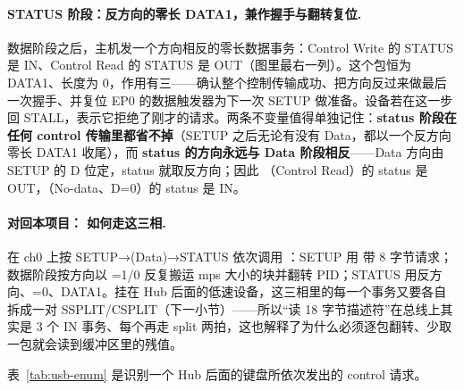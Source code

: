 \paragraph{STATUS 阶段：反方向的零长 DATA1，兼作握手与翻转复位.}
数据阶段之后，主机发一个方向相反的零长数据事务：Control Write 的 STATUS 是 IN、Control Read 的 STATUS 是 OUT（图里最右一列）。这个包恒为 DATA1、长度为 0，作用有三——确认整个控制传输成功、把方向反过来做最后一次握手、并复位 EP0 的数据触发器为下一次 SETUP 做准备。设备若在这一步回 STALL，表示它拒绝了刚才的请求。两条不变量值得单独记住：\textbf{status 阶段在任何 control 传输里都省不掉}（SETUP 之后无论有没有 Data，都以一个反方向零长 DATA1 收尾），而 \textbf{status 的方向永远与 Data 阶段相反}——Data 方向由 SETUP 的 D 位定，status 就取反方向；因此 （Control Read）的 status 是 OUT，（No-data、D=0）的 status 是 IN。

\paragraph{对回本项目： 如何走这三相.}
 在 ch0 上按 SETUP→(Data)→STATUS 依次调用 ：SETUP 用  带 8 字节请求；数据阶段按方向以 =1/0 反复搬运 mps 大小的块并翻转 PID；STATUS 用反方向、=0、DATA1。挂在 Hub 后面的低速设备，这三相里的每一个事务又要各自拆成一对 SSPLIT/CSPLIT（下一小节）——所以“读 18 字节描述符”在总线上其实是 3 个 IN 事务、每个再走 split 两拍，这也解释了为什么必须逐包翻转、少取一包就会读到缓冲区里的残值。

表~\ref{tab:usb-enum} 是识别一个 Hub 后面的键盘所依次发出的 control 请求。

